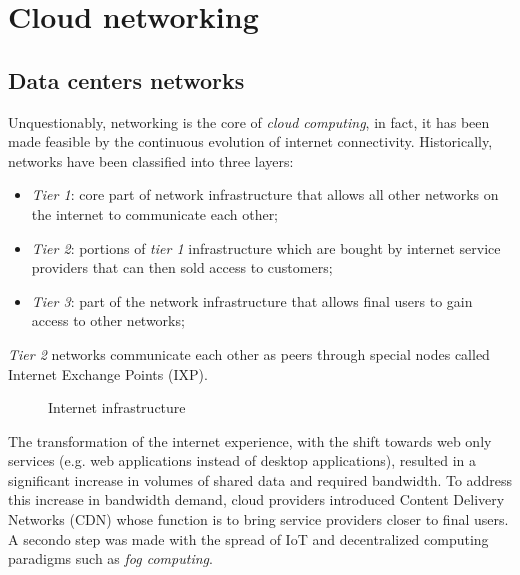 \chapter{Cloud networking}
\section{Data centers networks}
Unquestionably, networking is the core of \emph{cloud computing}, in fact, it
has been made feasible by the continuous evolution of internet connectivity.
Historically, networks have been classified into three layers:
\begin{itemize}
    \item \emph{Tier 1}: core part of network infrastructure that allows all
    other networks on the internet to communicate each other;
    \item \emph{Tier 2}: portions of \emph{tier 1} infrastructure which are
    bought by internet service providers that can then sold access to customers;
    \item \emph{Tier 3}: part of the network infrastructure that allows final
    users to gain access to other networks;
\end{itemize}
\begin{note}
    \emph{Tier 2} networks communicate each other as peers through special nodes
    called Internet Exchange Points (IXP).
\end{note}

\begin{figure}[h!]
    \centering
    \caption{Internet infrastructure}
\end{figure}

\noindent
The transformation of the internet experience, with the shift towards web only
services (e.g. web applications instead of desktop applications), resulted in
a significant increase in volumes of shared data and required bandwidth. To
address this increase in bandwidth demand, cloud providers introduced Content
Delivery Networks (CDN) whose function is to bring service providers closer
to final users. A secondo step was made with the spread of IoT and
decentralized computing paradigms such as \emph{fog computing}.

\begin{figure}[ht!]
    \centering
    \hfill
    \\
    \\
\end{figure}

